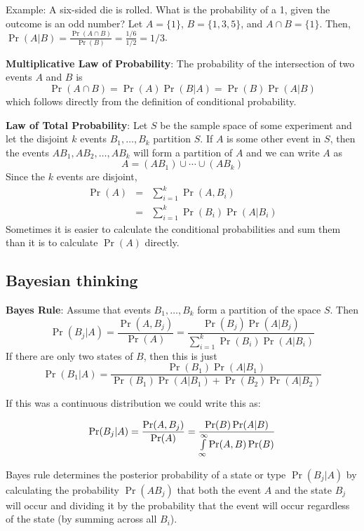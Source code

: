 \documentclass[20pt]{extarticle}
\newcommand{\beqa}{\begin{eqnarray}}
\newcommand{\eeqa}{\end{eqnarray}}
\newcommand{\non}{\nonumber}
\newcommand{\lint}{\int\limits}
\begin{document}
\item Example:  A six-sided die is rolled.  What is the probability of a
1, given the outcome is an odd number?  Let $A=\{ 1 \}$, $B=\{ 1, 3, 5
\}$, and $A\cap B=\{ 1 \}$.  Then, $\Pr(A|B)=\frac{\Pr(A\cap
B)}{\Pr(B)}=\frac{1/6}{1/2}=1/3$.

\item {\bf Multiplicative Law of Probability}: The probability of the
intersection of two events $A$ and $B$ is $$\Pr(A\cap
B)=\Pr(A)\Pr(B|A)=\Pr(B)\Pr(A|B)$$ which follows directly from the
definition of conditional probability.

\item {\bf Law of Total Probability}:  Let $S$ be the sample space of
some experiment and let the disjoint $k$ events $B_1,\ldots,B_k$
partition $S$.  If $A$ is some other event in $S$, then the events
$AB_1, AB_2, \ldots, AB_k$ will form a partition of $A$ and we can write
$A$ as $$A=(AB_1)\cup\cdots\cup (AB_k)$$  Since the $k$ events are
disjoint,
\beqa
\Pr(A)&=&\sum\limits_{i=1}^k \Pr(A,B_i)\non\\
      &=&\sum\limits_{i=1}^k \Pr(B_i)\Pr(A|B_i)\non
\eeqa
Sometimes it is easier to calculate the conditional probabilities and
sum them than it is to calculate $\Pr(A)$ directly.

\subsection{Bayesian thinking}

\item {\bf Bayes Rule}: Assume that events $B_1,\ldots,B_k$ form a
partition of the space $S$.  Then $$\Pr(B_j|A)= \frac{\Pr(A, B_j)}
{\Pr(A)} = \frac{\Pr(B_j)
\Pr(A|B_j)}{\sum\limits_{i=1}^k \Pr(B_i)\Pr(A|B_i)}$$
If there are only two states of $B$, then this is just
$$\Pr(B_1|A)=\frac{\Pr(B_1)\Pr(A|B_1)}
{\Pr(B_1)\Pr(A|B_1)+\Pr(B_2)\Pr(A|B_2)}$$


\item If this was a continuous distribution we could write this as:

$$\Pr(B_j|A)= \frac{\Pr(A, B_j)}
{\Pr(A)} = \frac{\Pr(B)
\Pr(A|B)}{\lint\limits_{\infty}^\infty \Pr(A, B)\Pr(B)}$$


\item Bayes rule  determines the posterior probability of a state or
type  $\Pr(B_j|A)$ by calculating the probability $\Pr(A B_j)$ that both
the event $A$ and the state $B_j$ will occur and dividing it by the
probability that the event will occur regardless of the state (by
summing across all $B_i$).
\end{document}

